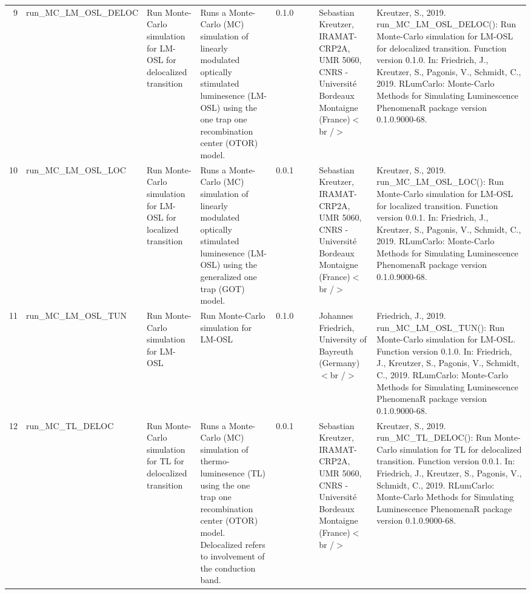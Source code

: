 \begin{table}[ht]
\begin{tabular}{rllllllll}
 \\ 
  9 & run\_MC\_LM\_OSL\_DELOC & Run Monte-Carlo simulation for LM-OSL for delocalized transition & Runs a Monte-Carlo (MC) simulation of linearly modulated optically stimulated luminesence (LM-OSL) using the one trap one recombination center (OTOR) model. & 0.1.0
 &  &  & Sebastian Kreutzer, IRAMAT-CRP2A, UMR 5060, CNRS - Université Bordeaux Montaigne (France)$<$br /$>$ & Kreutzer, S., 2019. run\_MC\_LM\_OSL\_DELOC(): Run Monte-Carlo simulation for LM-OSL for delocalized transition. Function version 0.1.0. In: Friedrich, J., Kreutzer, S., Pagonis, V., Schmidt, C., 2019. RLumCarlo: Monte-Carlo Methods for Simulating Luminescence PhenomenaR package version 0.1.0.9000-68. 
 \\ 
  10 & run\_MC\_LM\_OSL\_LOC & Run Monte-Carlo simulation for LM-OSL for localized transition & Runs a Monte-Carlo (MC) simulation of linearly modulated optically stimulated luminesence (LM-OSL) using the generalized one trap (GOT) model. & 0.0.1
 &  &  & Sebastian Kreutzer, IRAMAT-CRP2A, UMR 5060, CNRS - Université Bordeaux Montaigne (France)$<$br /$>$ & Kreutzer, S., 2019. run\_MC\_LM\_OSL\_LOC(): Run Monte-Carlo simulation for LM-OSL for localized transition. Function version 0.0.1. In: Friedrich, J., Kreutzer, S., Pagonis, V., Schmidt, C., 2019. RLumCarlo: Monte-Carlo Methods for Simulating Luminescence PhenomenaR package version 0.1.0.9000-68. 
 \\ 
  11 & run\_MC\_LM\_OSL\_TUN & Run Monte-Carlo simulation for LM-OSL & Run Monte-Carlo simulation for LM-OSL & 0.1.0
 &  &  & Johannes Friedrich, University of Bayreuth (Germany)$<$br /$>$ & Friedrich, J., 2019. run\_MC\_LM\_OSL\_TUN(): Run Monte-Carlo simulation for LM-OSL. Function version 0.1.0. In: Friedrich, J., Kreutzer, S., Pagonis, V., Schmidt, C., 2019. RLumCarlo: Monte-Carlo Methods for Simulating Luminescence PhenomenaR package version 0.1.0.9000-68. 
 \\ 
  12 & run\_MC\_TL\_DELOC & Run Monte-Carlo simulation for TL for delocalized transition & Runs a Monte-Carlo (MC) simulation of thermo-luminesence (TL) using the one trap one recombination center (OTOR) model. Delocalized refers to involvement of the conduction band. & 0.0.1
 &  &  & Sebastian Kreutzer, IRAMAT-CRP2A, UMR 5060, CNRS - Université Bordeaux Montaigne (France)$<$br /$>$ & Kreutzer, S., 2019. run\_MC\_TL\_DELOC(): Run Monte-Carlo simulation for TL for delocalized transition. Function version 0.0.1. In: Friedrich, J., Kreutzer, S., Pagonis, V., Schmidt, C., 2019. RLumCarlo: Monte-Carlo Methods for Simulating Luminescence PhenomenaR package version 0.1.0.9000-68. 

\end{tabular}
\end{table}
